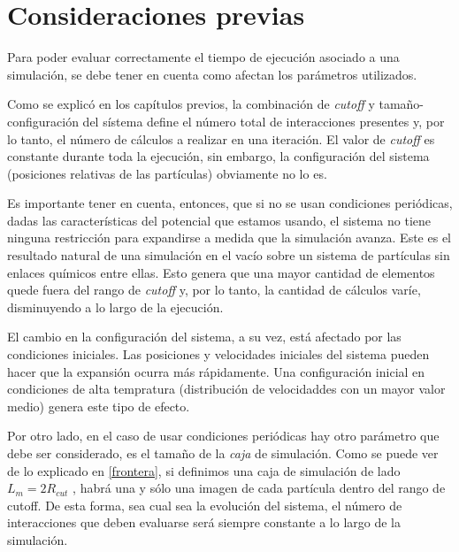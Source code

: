 \section{Consideraciones previas}\label{introResultados}
Para poder evaluar correctamente el tiempo de ejecución asociado a una simulación, se debe tener en cuenta como afectan los parámetros utilizados.

Como se explicó en los capítulos previos, la combinación de \textit{cutoff} y tamaño-configuración del sístema define el número total de interacciones presentes y, por lo tanto, 
el número de cálculos a realizar en una iteración. El valor de \textit{cutoff} es constante durante toda la ejecución, sin embargo, la configuración del sistema (posiciones relativas de las partículas) obviamente no lo es.

Es importante tener en cuenta, entonces, que si no se usan condiciones periódicas, dadas las características del potencial que estamos usando,
el sistema no tiene ninguna restricción para expandirse a medida que la simulación avanza. Este es el resultado natural de una simulación en el vacío sobre un sistema de partículas sin enlaces químicos entre ellas.
Esto genera que una mayor cantidad de elementos quede fuera del rango de \textit{cutoff} y, por lo tanto, la cantidad de cálculos varíe, disminuyendo a lo largo de la ejecución.

El cambio en la configuración del sistema, a su vez, está afectado por las condiciones iniciales. Las posiciones y velocidades iniciales del sistema pueden hacer que la expansión ocurra más rápidamente. 
Una configuración inicial en condiciones de alta tempratura (distribución de velocidaddes con un mayor valor medio) genera este tipo de efecto. 

Por otro lado, en el caso de usar condiciones periódicas hay otro parámetro que debe ser considerado, es el tamaño de la \textit{caja} de simulación. 
Como se puede ver de lo explicado en \ref{frontera}, si definimos una caja de simulación de lado $L_m=2R_{cut}$ , habrá una y sólo una imagen de cada partícula dentro del rango de cutoff.
De esta forma, sea cual sea la evolución del sistema, el número de interacciones que deben evaluarse será siempre constante a lo largo de la simulación.


